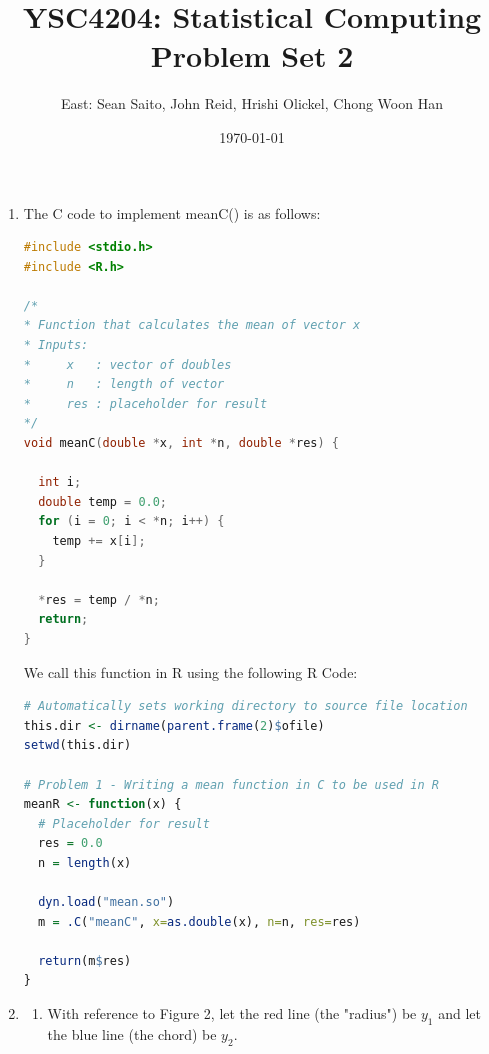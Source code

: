 \documentclass{amsart}
\title{YSC4204: Statistical Computing\\
Problem Set 2}
\author{East: Sean Saito, John Reid, Hrishi Olickel, Chong Woon Han}
\date{\today}
\theoremstyle{definition}
\theoremstyle{remark}
\begin{document}
\maketitle

\begin{enumerate}
\item
The C code to implement meanC() is as follows:
\begin{lstlisting}[language=C]
#include <stdio.h>
#include <R.h>

/*
* Function that calculates the mean of vector x
* Inputs:
*     x   : vector of doubles
*     n   : length of vector
*     res : placeholder for result
*/
void meanC(double *x, int *n, double *res) {

  int i;
  double temp = 0.0;
  for (i = 0; i < *n; i++) {
    temp += x[i];
  }

  *res = temp / *n;
  return;
}
\end{lstlisting}
We call this function in R using the following R Code:
\begin{lstlisting}[language=R]
# Automatically sets working directory to source file location
this.dir <- dirname(parent.frame(2)$ofile)
setwd(this.dir)

# Problem 1 - Writing a mean function in C to be used in R
meanR <- function(x) {
  # Placeholder for result
  res = 0.0
  n = length(x)
  
  dyn.load("mean.so")
  m = .C("meanC", x=as.double(x), n=n, res=res)
  
  return(m$res)
}
\end{lstlisting}
\item
\begin{enumerate}
\item
With reference to Figure 2, let the red line (the "radius") be $y_1$ and let the blue line (the chord) be $y_2$. 


\end{enumerate}
\end{enumerate}
\end{document}
